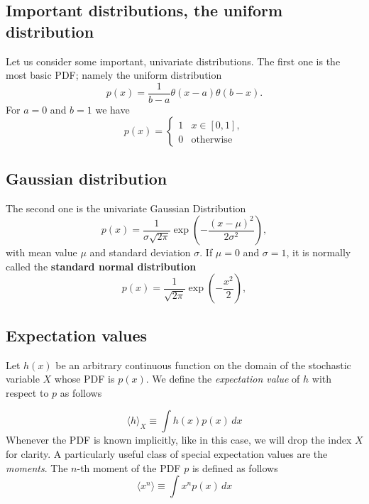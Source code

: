 \documentclass[%
oneside,                 %
final,                   %
10pt]{article}
\newenvironment{block_mdfboxadmon}[1][]{
\begin{block_mdfboxmdframed}[frametitle=#1]
}
{
\end{block_mdfboxmdframed}
}
\begin{document}
\subsection{Important distributions, the uniform distribution}

\begin{block_mdfboxadmon}[]
Let us consider some important, univariate distributions.
The first one
is the most basic PDF; namely the uniform distribution
\begin{equation}
p(x) = \frac{1}{b-a}\theta(x-a)\theta(b-x).
\label{eq:unifromPDF}
\end{equation}
For $a=0$ and $b=1$ we have 
\[
p(x) = \left\{
\begin{array}{ll}
1 & x \in [0,1],\\
0 & \mathrm{otherwise}
\end{array}
\right.
\]
\end{block_mdfboxadmon} %



\subsection{Gaussian distribution}

\begin{block_mdfboxadmon}[]
The second one is the univariate Gaussian Distribution
\begin{equation*}
p(x) = \frac{1}{\sigma\sqrt{2\pi}} \exp{(-\frac{(x-\mu)^2}{2\sigma^2})},
\end{equation*}
with mean value $\mu$ and standard deviation $\sigma$. If $\mu=0$ and $\sigma=1$, it is normally called the \textbf{standard normal distribution}
\begin{equation*}
p(x) = \frac{1}{\sqrt{2\pi}} \exp{(-\frac{x^2}{2})},
\end{equation*}
\end{block_mdfboxadmon} %




\subsection{Expectation values}

\begin{block_mdfboxadmon}[]
Let $h(x)$ be an arbitrary continuous function on the domain of the stochastic
variable $X$ whose PDF is $p(x)$. We define the \emph{expectation value}
of $h$ with respect to $p$ as follows

\begin{equation}
\langle h \rangle_X \equiv \int\! h(x)p(x)\,dx
\label{eq:expectation_value_of_h_wrt_p}
\end{equation}
Whenever the PDF is known implicitly, like in this case, we will drop
the index $X$ for clarity.  
A particularly useful class of special expectation values are the
\emph{moments}. The $n$-th moment of the PDF $p$ is defined as
follows
\begin{equation*}
\langle x^n \rangle \equiv \int\! x^n p(x)\,dx
\end{equation*}
\end{block_mdfboxadmon} %
\end{document}
